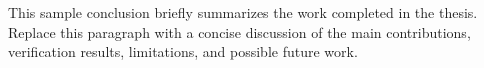 \begin{conclusion}
This sample conclusion briefly summarizes the work completed in the thesis. Replace this paragraph with a concise discussion of the main contributions, verification results, limitations, and possible future work.
\end{conclusion}

